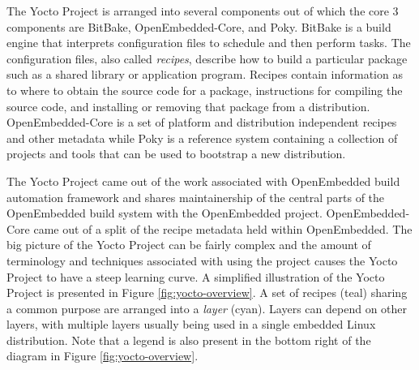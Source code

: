 The Yocto Project is arranged into several components out of which the core 3 components are BitBake, OpenEmbedded-Core, and Poky. BitBake is a build engine that interprets configuration files to schedule and then perform tasks. The configuration files, also called  \textit{recipes}, describe how to build a particular package such as a shared library or application program. Recipes contain information as to where to obtain the source code for a package, instructions for compiling the source code, and installing or removing that package from a distribution. OpenEmbedded-Core is a set of platform and distribution independent recipes and other metadata while Poky is a reference system containing a collection of projects and tools that can be used to bootstrap a new distribution.

The Yocto Project came out of the work associated with OpenEmbedded build automation framework and shares maintainership of the central parts of the OpenEmbedded build system with the OpenEmbedded project. OpenEmbedded-Core came out of a split of the recipe metadata held within OpenEmbedded. The big picture of the Yocto Project can be fairly complex and the amount of terminology and techniques associated with using the project causes the Yocto Project to have a steep learning curve. A simplified illustration of the Yocto Project is presented in Figure \ref{fig:yocto-overview}. A set of recipes (teal) sharing a common purpose are arranged into a \textit{layer} (cyan). Layers can depend on other layers, with multiple layers usually being used in a single embedded Linux distribution. Note that a legend is also present in the bottom right of the diagram in Figure \ref{fig:yocto-overview}.

